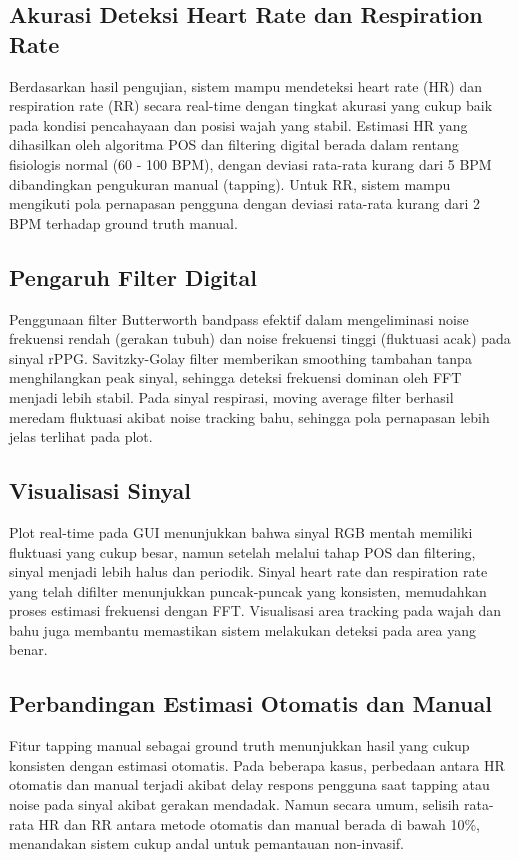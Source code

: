 \documentclass[11pt,a4paper]{article}
\begin{document}
\subsection{Akurasi Deteksi Heart Rate dan Respiration Rate}
Berdasarkan hasil pengujian, sistem mampu mendeteksi heart rate (HR) dan respiration rate (RR) secara real-time dengan tingkat akurasi yang cukup baik pada kondisi pencahayaan dan posisi wajah yang stabil. Estimasi HR yang dihasilkan oleh algoritma POS dan filtering digital berada dalam rentang fisiologis normal (60 - 100 BPM), dengan deviasi rata-rata kurang dari 5 BPM dibandingkan pengukuran manual (tapping). Untuk RR, sistem mampu mengikuti pola pernapasan pengguna dengan deviasi rata-rata kurang dari 2 BPM terhadap ground truth manual.

\subsection{Pengaruh Filter Digital}
Penggunaan filter Butterworth bandpass efektif dalam mengeliminasi noise frekuensi rendah (gerakan tubuh) dan noise frekuensi tinggi (fluktuasi acak) pada sinyal rPPG. Savitzky-Golay filter memberikan smoothing tambahan tanpa menghilangkan peak sinyal, sehingga deteksi frekuensi dominan oleh FFT menjadi lebih stabil. Pada sinyal respirasi, moving average filter berhasil meredam fluktuasi akibat noise tracking bahu, sehingga pola pernapasan lebih jelas terlihat pada plot.

\subsection{Visualisasi Sinyal}
Plot real-time pada GUI menunjukkan bahwa sinyal RGB mentah memiliki fluktuasi yang cukup besar, namun setelah melalui tahap POS dan filtering, sinyal menjadi lebih halus dan periodik. Sinyal heart rate dan respiration rate yang telah difilter menunjukkan puncak-puncak yang konsisten, memudahkan proses estimasi frekuensi dengan FFT. Visualisasi area tracking pada wajah dan bahu juga membantu memastikan sistem melakukan deteksi pada area yang benar.

\subsection{Perbandingan Estimasi Otomatis dan Manual}
Fitur tapping manual sebagai ground truth menunjukkan hasil yang cukup konsisten dengan estimasi otomatis. Pada beberapa kasus, perbedaan antara HR otomatis dan manual terjadi akibat delay respons pengguna saat tapping atau noise pada sinyal akibat gerakan mendadak. Namun secara umum, selisih rata-rata HR dan RR antara metode otomatis dan manual berada di bawah 10\%, menandakan sistem cukup andal untuk pemantauan non-invasif.
\end{document}
